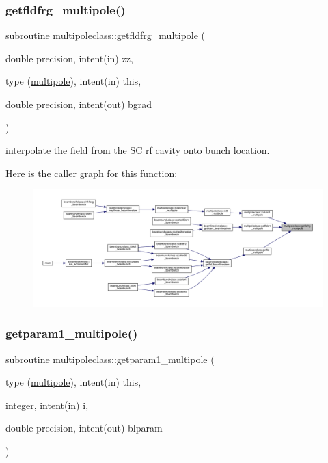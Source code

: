 \subsubsection{\texorpdfstring{getfldfrg\_multipole()}{getfldfrg\_multipole()}}
{\footnotesize\ttfamily subroutine multipoleclass\+::getfldfrg\+\_\+multipole (\begin{DoxyParamCaption}\item[{double precision, intent(in)}]{zz,  }\item[{type (\mbox{\hyperlink{namespacemultipoleclass_structmultipoleclass_1_1multipole}{multipole}}), intent(in)}]{this,  }\item[{double precision, intent(out)}]{bgrad }\end{DoxyParamCaption})}



interpolate the field from the SC rf cavity onto bunch location. 

Here is the caller graph for this function\+:\nopagebreak
\begin{figure}[H]
\begin{center}
\leavevmode
\includegraphics[width=350pt]{namespacemultipoleclass_a8712b7622d8ed7c0e71cdc18204dcf46_icgraph}
\end{center}
\end{figure}
\mbox{\label{namespacemultipoleclass_afc5919c9854c17e95241242284635eaf}} 
\subsubsection{\texorpdfstring{getparam1\_multipole()}{getparam1\_multipole()}}
{\footnotesize\ttfamily subroutine multipoleclass\+::getparam1\+\_\+multipole (\begin{DoxyParamCaption}\item[{type (\mbox{\hyperlink{namespacemultipoleclass_structmultipoleclass_1_1multipole}{multipole}}), intent(in)}]{this,  }\item[{integer, intent(in)}]{i,  }\item[{double precision, intent(out)}]{blparam }\end{DoxyParamCaption})}

